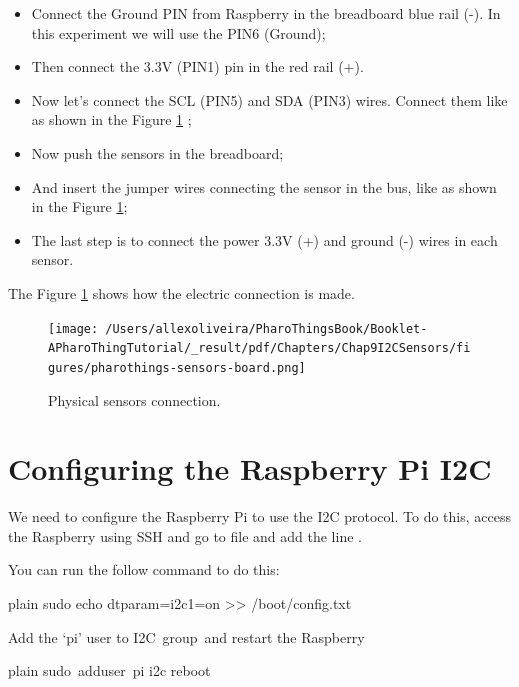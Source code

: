 \documentclass[10pt,twoside,english]{_support/latex/sbabook/sbabook}
\begin{document}
\begin{itemize}
\item Connect the Ground PIN from Raspberry in the breadboard blue rail (-). In this experiment we will use the PIN6 (Ground);
\item Then connect the 3.3V (PIN1) pin in the red rail (+). 
\item Now let's connect the SCL (PIN5) and SDA (PIN3) wires. Connect them like as shown in the Figure \ref{physicalSensors} ;
\item Now push the sensors in the breadboard;
\item And insert the jumper wires connecting the sensor in the bus, like as shown in the Figure \ref{physicalSensors};
\item The last step is to connect the power 3.3V (+) and ground (-) wires in each sensor.
\end{itemize}

The Figure \ref{physicalSensors} shows how the electric connection is made.


\begin{figure}

\begin{center}
\texttt{[image: /Users/allexoliveira/PharoThingsBook/Booklet-APharoThingTutorial/\_result/pdf/Chapters/Chap9I2CSensors/figures/pharothings-sensors-board.png]}\caption{Physical sensors connection.\label{physicalSensors}}\end{center}
\end{figure}

\section{Configuring the Raspberry Pi I2C}
We need to configure the Raspberry Pi to use the I2C protocol. To do this, access the Raspberry using SSH and go to file  and add the line .

You can run the follow command to do this:

\begin{displaycode}{plain}
sudo echo dtparam=i2c1=on >> /boot/config.txt
\end{displaycode}

Add the ‘pi’ user to I2C group and restart the Raspberry 

\begin{displaycode}{plain}
sudo adduser pi i2c 
reboot
\end{displaycode}
\end{document}
